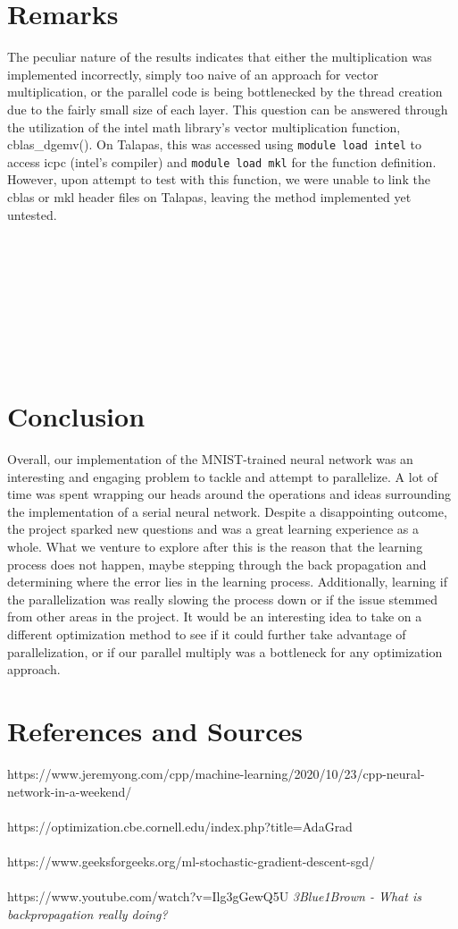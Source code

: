 \documentclass[12pt, twocolumn]{report}
\begin{document}
\section*{Remarks}
The peculiar nature of the results indicates that either the multiplication was implemented incorrectly, simply too naive of an approach
for vector multiplication, or the parallel code is being bottlenecked by the thread creation due to the fairly small size of each layer.
This question can be answered through the utilization of the intel math library's vector multiplication function, cblas\_dgemv().
On Talapas, this was accessed using \texttt{module load intel} to access icpc (intel's compiler) and \texttt{module load mkl} for the function definition. However, upon attempt to test
with this function, we were unable to link the cblas or mkl header files on Talapas, leaving the method implemented yet untested.
\\ \\ \\ \\ \\ \\ \\ \\ \\
\section*{Conclusion}
Overall, our implementation of the MNIST-trained neural network was an interesting and
engaging problem to tackle and attempt to parallelize. A lot of time was spent wrapping our heads around
the operations and ideas surrounding the implementation of a serial neural network. Despite a disappointing outcome, the project sparked new questions and was a great learning experience as a whole.
What we venture to explore after this is the reason that the learning process does not happen, maybe stepping through the back propagation and determining where the error lies in the learning process.
Additionally, learning if the parallelization was really slowing the process down or if the issue stemmed from other areas in the project. It would be an interesting idea
to take on a different optimization method to see if it could further take advantage of parallelization, or if our parallel multiply was a bottleneck for any optimization approach.
\\

\section*{References and Sources}
https://www.jeremyong.com/cpp/machine-learning/2020/10/23/cpp-neural-network-in-a-weekend/
\\ \\
https://optimization.cbe.cornell.edu/index.php?title=AdaGrad
\\ \\
https://www.geeksforgeeks.org/ml-stochastic-gradient-descent-sgd/
\\ \\
https://www.youtube.com/watch?v=Ilg3gGewQ5U \em 3Blue1Brown - What is backpropagation really doing?
\end{document}
